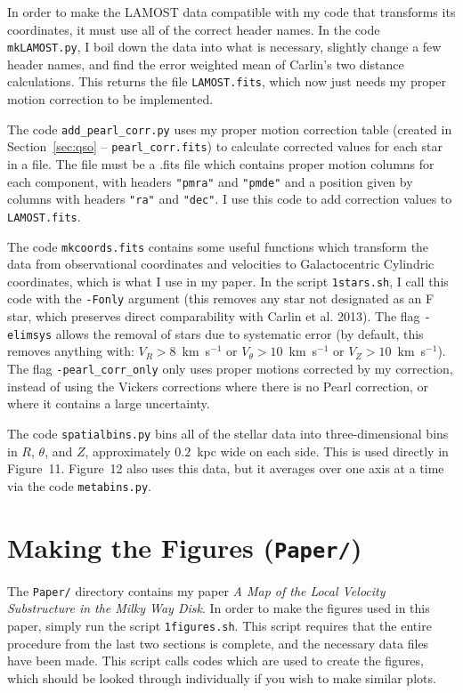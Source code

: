 \documentclass{article}
\begin{document}
In order to make the LAMOST data compatible with my code that transforms its coordinates, it must use all of the correct header names. In the code \texttt{mkLAMOST.py}, I boil down the data into what is necessary, slightly change a few header names, and find the error weighted mean of Carlin's two distance calculations. This returns the file \texttt{LAMOST.fits}, which now just needs my proper motion correction to be implemented.

The code \texttt{add\_pearl\_corr.py} uses my proper motion correction table (created in Section~\ref{sec:qso} -- \texttt{pearl\_corr.fits}) to calculate corrected values for each star in a file. The file must be a .fits file which contains proper motion columns for each component, with headers \texttt{"pmra"} and \texttt{"pmde"} and a position given by columns with headers \texttt{"ra"} and \texttt{"dec"}. I use this code to add correction values to \texttt{LAMOST.fits}.

The code \texttt{mkcoords.fits} contains some useful functions which transform the data from observational coordinates and velocities to Galactocentric Cylindric coordinates, which is what I use in my paper. In the script \texttt{1stars.sh}, I call this code with the \texttt{-Fonly} argument (this removes any star not designated as an F star, which preserves direct comparability with Carlin et al. 2013). The flag \texttt{-elimsys} allows the removal of stars due to systematic error (by default, this removes anything with: $V_R > 8$~km~s$^{-1}$ or $V_\theta > 10$~km~s$^{-1}$ or $V_Z > 10$~km~s$^{-1}$). The flag \texttt{-pearl\_corr\_only} only uses proper motions corrected by my correction, instead of using the Vickers corrections where there is no Pearl correction, or where it contains a large uncertainty.

The code \texttt{spatialbins.py} bins all of the stellar data into three-dimensional bins in $R$, $\theta$, and $Z$, approximately $0.2$~kpc wide on each side. This is used directly in Figure~11. Figure~12 also uses this data, but it averages over one axis at a time via the code \texttt{metabins.py}.

\section{Making the Figures (\texttt{Paper/})}

The \texttt{Paper/} directory contains my paper \textit{A Map of the Local Velocity Substructure in the Milky Way Disk}. In order to make the figures used in this paper, simply run the script \texttt{1figures.sh}. This script requires that the entire procedure from the last two sections is complete, and the necessary data files have been made. This script calls codes which are used to create the figures, which should be looked through individually if you wish to make similar plots.
\end{document}
